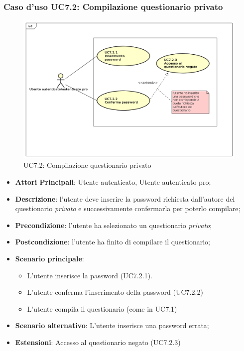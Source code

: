 \subsubsection{Caso d'uso UC7.2: Compilazione questionario privato}
\label{UC7.2}
\begin{figure}[h]
\centering
\includegraphics[scale=0.5,keepaspectratio]{UML/UC7_2.png}
\caption{UC7.2: Compilazione questionario privato}
\end{figure}
\FloatBarrier
\begin{itemize}
\item\textbf{Attori Principali}: Utente autenticato, Utente autenticato pro;
\item\textbf{Descrizione}: l'utente deve inserire la password richiesta dall'autore del questionario \textit{privato} e successivamente confermarla per poterlo compilare;
\item\textbf{Precondizione}: l'utente ha selezionato un questionario \textit{privato};
\item\textbf{Postcondizione}: l'utente ha finito di compilare il questionario;
\item\textbf{Scenario principale}:
\begin{itemize}
\item L'utente inserisce la password (UC7.2.1).
\item L'utente conferma l'inserimento della password (UC7.2.2)
\item L'utente compila il questionario (come in UC7.1)
\end{itemize}
\item\textbf{Scenario alternativo}: L'utente inserisce una password errata;
\item\textbf{Estensioni}: Accesso al questionario negato (UC7.2.3)
\end{itemize}

